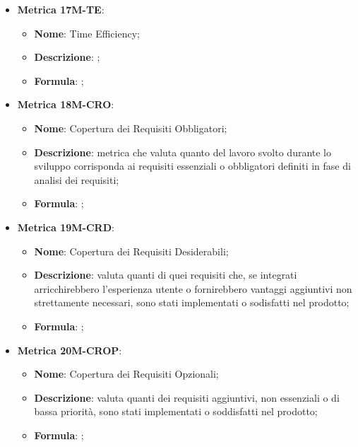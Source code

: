 \begin{itemize}
    \item \textbf{Metrica 17M-TE}:
    \begin{itemize}
        \item \textbf{Nome}: Time Efficiency;
        \item \textbf{Descrizione}: ;
        \item \textbf{Formula}: ;
    \end{itemize}
\end{itemize}

\begin{itemize}
    \item \textbf{Metrica 18M-CRO}:
    \begin{itemize}
        \item \textbf{Nome}: Copertura dei Requisiti Obbligatori;
        \item \textbf{Descrizione}: metrica che valuta quanto del lavoro svolto durante lo sviluppo corrisponda ai requisiti essenziali o obbligatori definiti in fase di analisi dei requisiti;
        \item \textbf{Formula}: ;
    \end{itemize}
\end{itemize}

\begin{itemize}
    \item \textbf{Metrica 19M-CRD}:
    \begin{itemize}
        \item \textbf{Nome}: Copertura dei Requisiti Desiderabili;
        \item \textbf{Descrizione}: valuta quanti di quei requisiti che, se integrati arricchirebbero l'esperienza utente o fornirebbero vantaggi aggiuntivi non strettamente necessari, sono stati implementati o sodisfatti nel prodotto;
        \item \textbf{Formula}: ;
    \end{itemize}
\end{itemize}

\begin{itemize}
    \item \textbf{Metrica 20M-CROP}:
    \begin{itemize}
        \item \textbf{Nome}: Copertura dei Requisiti Opzionali;
        \item \textbf{Descrizione}: valuta quanti dei requisiti aggiuntivi, non essenziali o di bassa priorità, sono stati implementati o soddisfatti nel prodotto;
        \item \textbf{Formula}: ;
    \end{itemize}
\end{itemize}

